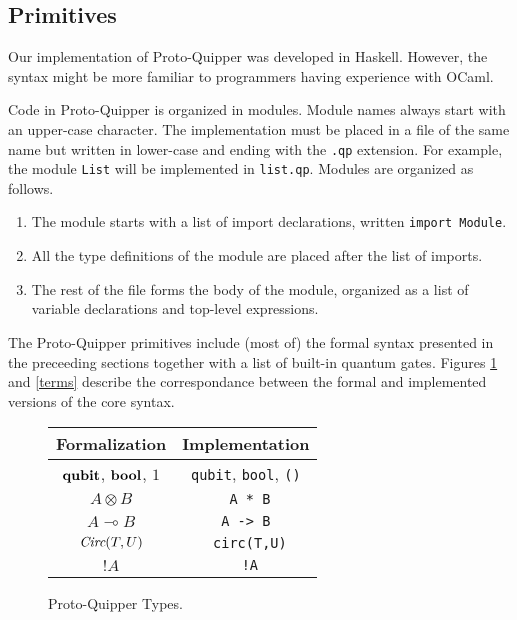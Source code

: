 \subsection{Primitives}

Our implementation of Proto-Quipper was developed in Haskell. However, the 
syntax might be more familiar to programmers having experience with OCaml.

Code in Proto-Quipper is organized in modules. Module names always start 
with an upper-case character. The implementation must be placed in a file 
of the same name but written in lower-case and ending with the {\tt.qp} 
extension. For example, the module {\tt List} will be implemented in 
{\tt list.qp}. Modules are organized as follows.
\begin{enumerate}
  \item The module starts with a list of import declarations, written 
  {\tt import Module}.
  \item All the type definitions of the module are placed after the list 
  of imports.
  \item The rest of the file forms the body of the module, organized as a 
  list of variable declarations and top-level expressions.
\end{enumerate}

The Proto-Quipper primitives include (most of) the formal syntax presented 
in the preceeding sections together with a list of built-in quantum gates. 
Figures \hyperref[types]{\ref*{types}} and \hyperref[terms]{\ref*{terms}} 
describe the correspondance between the formal and implemented versions of 
the core syntax.

\begin{figure}[!ht]
\begin{center}
\renewcommand{\arraystretch}{1.4}
\begin{tabular}{|c|c|}
  \hline
  \textbf{Formalization}    & \textbf{Implementation} \\\hline
  $\textrm{\bf qubit}$, $\textrm{\bf bool}$, $1$    & \verb#qubit#, \verb#bool#, \verb#()# \\\hline
  $A \otimes B$             & \verb# A * B# \\\hline
  $A \multimap B$           & \verb# A -> B # \\\hline
  $\mathop{\textit{Circ}}\nolimits(T, U)$              & \verb# circ(T,U)# \\\hline
  ${!} A$                   & \verb# !A# \\\hline
\end{tabular}
\end{center}
\caption{Proto-Quipper Types.}
\label{types}
\end{figure}

